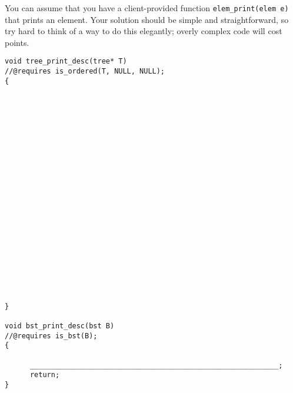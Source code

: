 \documentclass[12pt]{exam}
\begin{document}
\begin{questions}
\begin{parts}
You can assume that you have a client-provided function
\verb'elem_print(elem e)' that prints an element. Your solution should
be simple and straightforward, so try hard to think of a way to do
this elegantly; overly complex code will cost points.

\begin{solution}
\begin{verbatim}
void tree_print_desc(tree* T)
//@requires is_ordered(T, NULL, NULL);
{






















}

void bst_print_desc(bst B)
//@requires is_bst(B);
{

      ___________________________________________________________;
      return;
}
\end{verbatim}
\end{solution}

\end{parts}

\end{questions}
\end{document}
